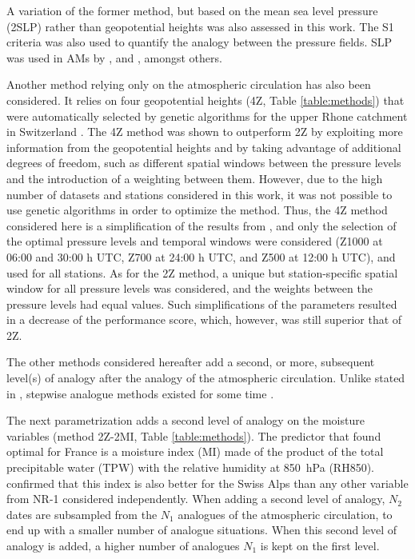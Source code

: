 \documentclass{ametsoc}
\begin{document}
A variation of the former method, but based on the mean sea level pressure (2SLP) rather than geopotential heights was also assessed in this work. The S1 criteria was also used to quantify the analogy between the pressure fields. SLP was used in AMs by \citet{Zorita1999}, \citet{Timbal2001a} and \citet{Martin2014b}, amongst others.

Another method relying only on the atmospheric circulation has also been considered. It relies on four geopotential heights (4Z, Table \ref{table:methods}) that were automatically selected by genetic algorithms for the upper Rhone catchment in Switzerland \citep{Horton2017b}. The 4Z method was shown to outperform 2Z by exploiting more information from the geopotential heights and by taking advantage of additional degrees of freedom, such as different spatial windows between the pressure levels and the introduction of a weighting between them. However, due to the high number of datasets and stations considered in this work, it was not possible to use genetic algorithms in order to optimize the method. Thus, the 4Z method considered here is a simplification of the results from \citet{Horton2017b}, and only the selection of the optimal pressure levels and temporal windows were considered (Z1000 at 06:00 and 30:00 h UTC, Z700 at 24:00 h UTC, and Z500 at 12:00 h UTC), and used for all stations. As for the 2Z method, a unique but station-specific spatial window for all pressure levels was considered, and the weights between the pressure levels had equal values. Such simplifications of the parameters resulted in a decrease of the performance score, which, however, was still superior that of 2Z.

The other methods considered hereafter add a second, or more, subsequent level(s) of analogy after the analogy of the atmospheric circulation. Unlike stated in \citet{Caillouet2016}, stepwise analogue methods existed for some time \citep[e.g.][]{Bontron2004, Bontron2005, Marty2010, Marty2012, Horton2012a}. 

The next parametrization adds a second level of analogy on the moisture variables (method 2Z-2MI, Table \ref{table:methods}). The predictor that \citet{Bontron2004} found optimal for France is a moisture index (MI) made of the product of the total precipitable water (TPW) with the relative humidity at 850~hPa (RH850). \cite{Horton2012a} confirmed that this index is also better for the Swiss Alps than any other variable from NR-1 considered independently. When adding a second level of analogy, $N_{2}$ dates are subsampled from the $N_{1}$ analogues of the atmospheric circulation, to end up with a smaller number of analogue situations. When this second level of analogy is added, a higher number of analogues $N_{1}$ is kept on the first level. 
\end{document}
